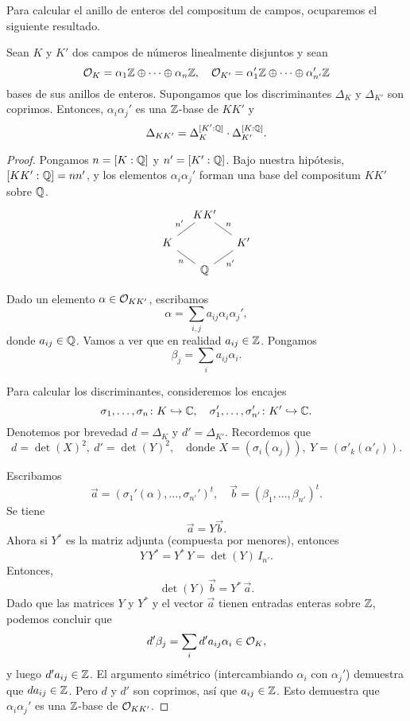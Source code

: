 Para calcular el anillo de enteros del compositum de campos, ocuparemos
el siguiente resultado.

\begin{proposicion}
  \label{prop:OK-del-compositum}
  Sean $K$ y $K'$ dos campos de números linealmente disjuntos y sean
  \[ \mathcal{O}_K = \alpha_1 \mathbb{Z} \oplus \cdots \oplus \alpha_n \mathbb{Z}, \quad
     \mathcal{O}_{K'} = \alpha_1' \mathbb{Z} \oplus \cdots \oplus \alpha_{n'}' \mathbb{Z} \]
  bases de sus anillos de enteros. Supongamos que los discriminantes $\Delta_K$
  y $\Delta_{K'}$ son coprimos. Entonces, $\alpha_i \alpha_j'$ es una
  $\mathbb{Z}$-base de $KK'$ y
  $$\Delta_{KK'} = \Delta_K^{[K' : \mathbb{Q}]} \cdot \Delta_{K'}^{[K : \mathbb{Q}]}.$$

  \begin{proof}
    Pongamos $n = [K : \mathbb{Q}]$ y $n' = [K' : \mathbb{Q}]$.
    Bajo nuestra hipótesis, $[KK' : \mathbb{Q}] = nn'$, y los elementos
    $\alpha_i \alpha_j'$ forman una base del compositum $KK'$ sobre $\mathbb{Q}$.
    \[ \begin{tikzcd}[row sep=1em,column sep=1em]
      & KK'\ar[-]{dl}[swap]{n'} \ar[-]{dr}{n} \\
      K\ar[-]{dr}[swap]{n} & & K'\ar[-]{dl}{n'} \\
      & \QQ
    \end{tikzcd} \]

    Dado un elemento $\alpha \in \mathcal{O}_{KK'}$, escribamos
    $$\alpha = \sum_{i,j} a_{ij} \alpha_i \alpha_j',$$
    donde $a_{ij} \in \mathbb{Q}$. Vamos a ver que en realidad $a_{ij} \in \mathbb{Z}$.
    Pongamos
    $$\beta_j = \sum_i a_{ij} \alpha_i.$$

    Para calcular los discriminantes, consideremos los encajes
    \[ \sigma_1, \ldots, \sigma_n\colon K \hookrightarrow \mathbb{C}, \quad
       \sigma'_1, \ldots, \sigma'_{n'}\colon K' \hookrightarrow \mathbb{C}. \]
    Denotemos por brevedad $d = \Delta_K$ y $d' = \Delta_{K'}$.
    Recordemos que
    \[ d = \det (X)^2, ~ d' = \det (Y)^2,
       \quad \text{donde }
       X = (\sigma_i (\alpha_j)), ~
       Y = (\sigma'_k (\alpha'_\ell)). \]

    Escribamos
    \[ \vec{a} = (\sigma_1' (\alpha), \ldots, \sigma_{n'}')^t, \quad
       \vec{b} = (\beta_1, \ldots, \beta_{n'})^t. \]
    Se tiene
    $$\vec{a} = Y \vec{b}.$$
    Ahora si $Y^*$ es la matriz adjunta (compuesta por menores), entonces
    $$Y\,Y^* = Y^*\,Y = \det (Y)\,I_{n'}.$$
    Entonces,
    $$\det (Y)\,\vec{b} = Y^*\,\vec{a}.$$
    Dado que las matrices $Y$ y $Y^*$ y el vector $\vec{a}$ tienen entradas
    enteras sobre $\mathbb{Z}$, podemos concluir que
    $$d' \beta_j = \sum_i d' a_{ij} \alpha_i \in \mathcal{O}_K,$$
    y luego $d' a_{ij} \in \mathbb{Z}$. El argumento simétrico (intercambiando
    $\alpha_i$ con $\alpha_j'$) demuestra que $d a_{ij} \in \mathbb{Z}$. Pero
    $d$ y $d'$ son coprimos, así que $a_{ij} \in \mathbb{Z}$. Esto
    demuestra que $\alpha_i \alpha_j'$ es una $\mathbb{Z}$-base de $\mathcal{O}_{K K'}$.


\end{proof}
\end{proposicion}
